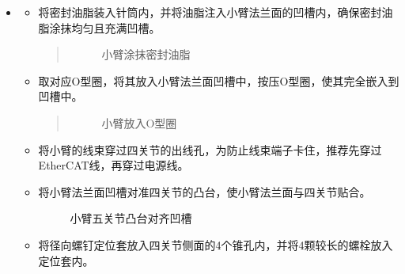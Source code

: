 \documentclass[a4paper,11pt,english,openany,oneside]{sphinxmanual}
\begin{document}
\begin{itemize}
\begin{itemize}
\item {} 
\sphinxAtStartPar
使用扎带将线圈固定件上方的热缩管扎上，使用斜口钳将多余扎带剪掉，注意剪扎带时切勿剪到线束。

\end{itemize}

\item {} 
\sphinxAtStartPar
{}
\begin{itemize}
\item {} 
\sphinxAtStartPar
将密封油脂装入针筒内，并将油脂注入小臂法兰面的凹槽内，确保密封油脂涂抹均匀且充满凹槽。
\begin{quote}

\begin{figure}[H]
\centering
\capstart

\noindent{}
\caption{小臂涂抹密封油脂}\label{\detokenize{_u66f4_u6362_u5173_u8282:id87}}\end{figure}
\end{quote}

\item {} 
\sphinxAtStartPar
取对应O型圈，将其放入小臂法兰面凹槽中，按压O型圈，使其完全嵌入到凹槽中。
\begin{quote}

\begin{figure}[H]
\centering
\capstart

\noindent{}
\caption{小臂放入O型圈}\label{\detokenize{_u66f4_u6362_u5173_u8282:id88}}\end{figure}
\end{quote}

\item {} 
\sphinxAtStartPar
将小臂的线束穿过四关节的出线孔，为防止线束端子卡住，推荐先穿过EtherCAT线，再穿过电源线。

\item {} 
\sphinxAtStartPar
将小臂法兰面凹槽对准四关节的凸台，使小臂法兰面与四关节贴合。

\begin{figure}[H]
\centering
\capstart

\noindent{}
\caption{小臂五关节凸台对齐凹槽}\label{\detokenize{_u66f4_u6362_u5173_u8282:id89}}\end{figure}

\item {} 
\sphinxAtStartPar
将径向螺钉定位套放入四关节侧面的4个锥孔内，并将4颗较长的螺栓放入定位套内。


\end{itemize}
\end{itemize}
\end{document}
